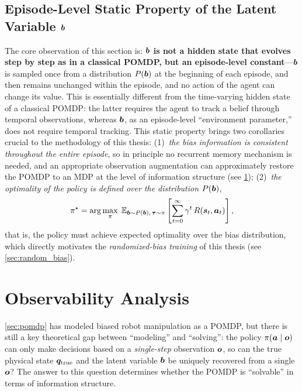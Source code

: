 \subsection{Episode-Level Static Property of the Latent Variable \texorpdfstring{$\bm{b}$}{b}}\label{subsec:bias_static}

The core observation of this section is: \textbf{$\bm{b}$ is not a hidden state that evolves step by step as in a classical POMDP, but an episode-level constant}---$\bm{b}$ is sampled once from a distribution $P(\bm{b})$ at the beginning of each episode, and then remains unchanged within the episode, and no action of the agent can change its value. This is essentially different from the time-varying hidden state of a classical POMDP: the latter requires the agent to track a belief through temporal observations, whereas $\bm{b}$, as an episode-level ``environment parameter,'' does not require temporal tracking. This static property brings two corollaries crucial to the methodology of this thesis: (1)~\emph{the bias information is consistent throughout the entire episode}, so in principle no recurrent memory mechanism is needed, and an appropriate observation augmentation can approximately restore the POMDP to an MDP at the level of information structure (see \cref{sec:observability}); (2)~\emph{the optimality of the policy is defined over the distribution $P(\bm{b})$},
\begin{equation}
  \pi^\star = \arg\max_{\pi}\; \mathbb{E}_{\bm{b} \sim P(\bm{b}),\,\bm{\tau} \sim \pi} \left[\sum_{t=0}^{\infty} \gamma^t\, R(\bm{s}_t, \bm{a}_t)\right],
  \label{eq:objective}
\end{equation}
that is, the policy must achieve expected optimality over the bias distribution, which directly motivates the \emph{randomized-bias training} of this thesis (see \cref{sec:random_bias}).

\section{Observability Analysis}\label{sec:observability}

\cref{sec:pomdp} has modeled biased robot manipulation as a POMDP, but there is still a key theoretical gap between ``modeling'' and ``solving'': the policy $\pi(\bm{a} \mid \bm{o})$ can only make decisions based on a \emph{single-step} observation $\bm{o}$, so can the true physical state $\bm{q}_{\text{true}}$ and the latent variable $\bm{b}$ be uniquely recovered from a single $\bm{o}$? The answer to this question determines whether the POMDP is ``solvable'' in terms of information structure.

